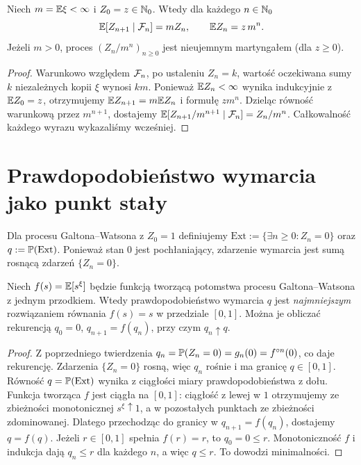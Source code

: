 \begin{twierdzenie}
Niech $m=\mathbb{E}\xi<\infty$ i $Z_0=z\in\mathbb{N}_0$.
Wtedy dla każdego $n\in\mathbb{N}_0$
\[
\mathbb{E}[Z_{n+1}\mid\mathcal{F}_n]=mZ_n,\qquad
\mathbb{E} Z_n=z\,m^n.
\]
Jeżeli $m>0$, proces $(Z_n/m^n)_{n\ge0}$ jest
nieujemnym martyngałem (dla $z\ge0$).
\end{twierdzenie}
\begin{proof}
Warunkowo względem $\mathcal{F}_n$, po ustaleniu $Z_n=k$,
wartość oczekiwana sumy $k$ niezależnych kopii $\xi$
wynosi $km$. Ponieważ $\mathbb{E} Z_n<\infty$ wynika
indukcyjnie z $\mathbb{E} Z_0=z$, otrzymujemy
$\mathbb{E} Z_{n+1}=m\mathbb{E} Z_n$ i formułę $zm^n$.
Dzieląc równość warunkową przez $m^{n+1}$,
dostajemy $\mathbb{E}[Z_{n+1}/m^{n+1}\mid\mathcal{F}_n]=Z_n/m^n$.
Całkowalność każdego wyrazu wykazaliśmy wcześniej.
\end{proof}

\section{Prawdopodobieństwo wymarcia jako punkt stały}
\begin{definicja}[Wymarcie]
Dla procesu Galtona--Watsona z $Z_0=1$ definiujemy
$\mathrm{Ext}:=\{\exists n\ge0:Z_n=0\}$ oraz
$q:=\mathbb{P}(\mathrm{Ext})$.
Ponieważ stan $0$ jest pochłaniający,
zdarzenie wymarcia jest sumą rosnącą zdarzeń $\{Z_n=0\}$.
\end{definicja}

\begin{twierdzenie}
Niech $f(s)=\mathbb{E}[s^\xi]$ będzie funkcją tworzącą potomstwa
procesu Galtona--Watsona z jednym przodkiem.
Wtedy prawdopodobieństwo wymarcia $q$ jest
\emph{najmniejszym} rozwiązaniem równania $f(s)=s$
w przedziale $[0,1]$. Można je obliczać rekurencją
$q_0=0$, $q_{n+1}=f(q_n)$, przy czym
$q_n\uparrow q$.
\end{twierdzenie}
\begin{proof}
Z poprzedniego twierdzenia
$q_n=\mathbb{P}(Z_n=0)=g_n(0)=f^{\circ n}(0)$,
co daje rekurencję. Zdarzenia $\{Z_n=0\}$ rosną,
więc $q_n$ rośnie i ma granicę $q\in[0,1]$.
Równość $q=\mathbb{P}(\mathrm{Ext})$ wynika z ciągłości miary
prawdopodobieństwa z dołu.
Funkcja tworząca $f$ jest ciągła na $[0,1]$:
ciągłość z lewej w $1$ otrzymujemy ze zbieżności monotonicznej
$s^\xi\uparrow1$, a w pozostałych punktach ze zbieżności
zdominowanej. Dlatego przechodząc do granicy w
$q_{n+1}=f(q_n)$, dostajemy $q=f(q)$.
Jeżeli $r\in[0,1]$ spełnia $f(r)=r$, to $q_0=0\le r$.
Monotoniczność $f$ i indukcja dają $q_n\le r$
dla każdego $n$, a więc $q\le r$. To dowodzi minimalności.
\end{proof}


